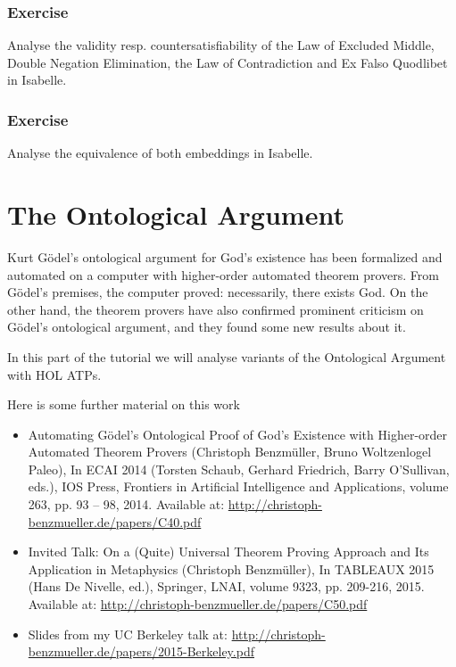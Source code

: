 \documentclass{article}
\begin{document}
\subsubsection{Exercise}
Analyse the validity resp. countersatisfiability of the Law of
Excluded Middle, Double Negation Elimination, the Law
of Contradiction and Ex Falso Quodlibet in Isabelle.

\subsubsection{Exercise}
Analyse the equivalence of both embeddings in Isabelle.



\section{The Ontological Argument}
Kurt G\"odel's ontological argument for God's existence has been
formalized and automated on a computer with higher-order automated
theorem provers. From G\"odel's premises, the computer proved:
necessarily, there exists God. On the other hand, the theorem provers
have also confirmed prominent criticism on G\"odel's ontological
argument, and they found some new results about it.

In this part of the tutorial we will analyse variants of the
Ontological Argument with HOL ATPs.

Here is some further material on this work
\begin{itemize}
\item Automating G\"odel's Ontological Proof of God's Existence with
Higher-order Automated Theorem Provers (Christoph Benzm\"uller, Bruno
Woltzenlogel Paleo), In ECAI 2014 (Torsten Schaub, Gerhard Friedrich,
Barry O'Sullivan, eds.), IOS Press, Frontiers in Artificial
Intelligence and Applications, volume 263, pp. 93 -- 98,
2014. Available at:   \href{http://christoph-benzmueller.de/papers/C40.pdf}{http://christoph-benzmueller.de/papers/C40.pdf}
\item Invited Talk: On a (Quite) Universal Theorem Proving Approach and Its Application in Metaphysics (Christoph Benzm\"uller), In TABLEAUX 2015 (Hans De Nivelle, ed.), Springer, LNAI, volume 9323, pp. 209-216, 2015. Available at:   \href{http://christoph-benzmueller.de/papers/C50.pdf}{http://christoph-benzmueller.de/papers/C50.pdf}
\item Slides from my UC Berkeley talk at:
  \href{http://christoph-benzmueller.de/papers/2015-Berkeley.pdf}{http://christoph-benzmueller.de/papers/2015-Berkeley.pdf}
\end{itemize}
\end{document}
